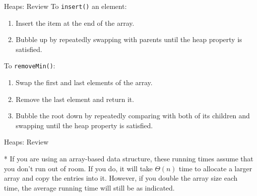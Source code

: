 \documentclass[9pt]{beamer}
\begin{document}
\begin{frame}[fragile]{Heaps: Review}
  To {\tt insert()} an element:
  \begin{enumerate}
    \item
      Insert the item at the end of the array.
    \item
      Bubble up by repeatedly swapping with parents until the heap property
      is satisfied.
  \end{enumerate}

  \vspace{2em}

  \pause
  To {\tt removeMin()}:
  \begin{enumerate}
    \item
      Swap the first and last elements of the array.
    \item
      Remove the last element and return it.
    \item
      Bubble the root down by repeatedly comparing with both of its children
      and swapping until the heap property is satisfied.
  \end{enumerate}
\end{frame}

\begin{frame}[fragile]{Heaps: Review}
        \begin{center}
        \end{center}

        \begin{description}
                \item{*}
                If you are using an array-based data structure, these running times assume that you don't run out of room. If you do, it will take $\Theta(n)$ time to allocate a larger array and copy the entries into it. However, if you double the array size each time, the average running time will still be as indicated.
        \end{description}
\end{frame}
\end{document}
